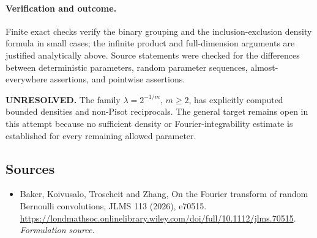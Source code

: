 \documentclass[11pt]{article}
\begin{document}
\paragraph{Verification and outcome.}
Finite exact checks verify the binary grouping and the inclusion-exclusion density formula in small cases; the infinite product and full-dimension arguments are justified analytically above. Source statements were checked for the differences between deterministic parameters, random parameter sequences, almost-everywhere assertions, and pointwise assertions.

\textbf{UNRESOLVED.} The family $\lambda=2^{-1/m}$, $m\ge2$, has explicitly computed bounded densities and non-Pisot reciprocals. The general target remains open in this attempt because no sufficient density or Fourier-integrability estimate is established for every remaining allowed parameter.

\subsection{Sources}
\begin{itemize}
\item[S1]Baker, Koivusalo, Troscheit and Zhang, On the Fourier transform of random Bernoulli convolutions, JLMS 113 (2026), e70515.
\url{https://londmathsoc.onlinelibrary.wiley.com/doi/full/10.1112/jlms.70515}.
\textit{Formulation source.}
\end{itemize}
\end{document}
